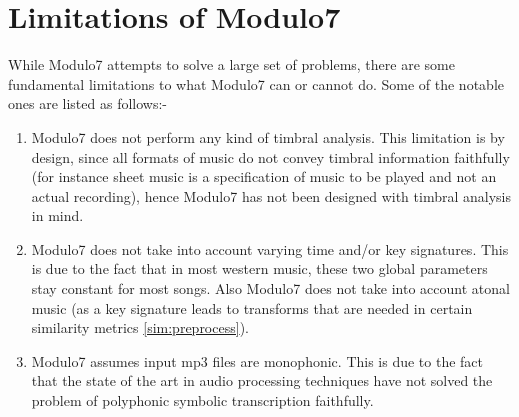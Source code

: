 \section{Limitations of Modulo7} 

\noindent While Modulo7 attempts to solve a large set of problems, there are some fundamental limitations to what Modulo7 can or cannot do. Some of the notable ones are listed as follows:-

\begin{enumerate}
\item Modulo7 does not perform any kind of timbral analysis. This limitation is by design, since all formats of music do not convey timbral information faithfully (for instance sheet music is a specification of music to be played and not an actual recording), hence Modulo7 has not been designed with timbral analysis in mind.
\item Modulo7 does not take into account varying time and/or key signatures. This is due to the fact that in most western music, these two global parameters stay constant for most songs. Also Modulo7 does not take into account atonal music (as a key signature leads to transforms that are needed in certain similarity metrics \ref{sim:preprocess}). 
\item Modulo7 assumes input mp3 files are monophonic. This is due to the fact that the state of the art in audio processing techniques have not solved the problem of polyphonic symbolic transcription faithfully. \cite{melextract}
\end{enumerate}
